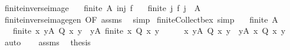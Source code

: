 \begin{isabellebody}
\endisatagproof
{\isafoldproof}%
%
\isadelimproof
\isanewline
%
\endisadelimproof
\isanewline
{}\isamarkupfalse%
\ finite{\isacharunderscore}{\kern0pt}inverse{\isacharunderscore}{\kern0pt}image{\isacharcolon}{\kern0pt}\isanewline
\ \ \ {\isachardoublequoteopen}finite\ A{\isachardoublequoteclose}\ {\isachardoublequoteopen}inj\ f{\isachardoublequoteclose}\isanewline
\ \ \ {\isachardoublequoteopen}finite\ {\isacharbraceleft}{\kern0pt}j{\isachardot}{\kern0pt}\ f\ j\ {\isasymin}\ A{\isacharbraceright}{\kern0pt}{\isachardoublequoteclose}\isanewline
%
\isadelimproof
\ \ %
\endisadelimproof
%
\isatagproof
{}\isamarkupfalse%
\ finite{\isacharunderscore}{\kern0pt}inverse{\isacharunderscore}{\kern0pt}image{\isacharunderscore}{\kern0pt}gen\ {\isacharbrackleft}{\kern0pt}OF\ assms{\isacharbrackright}{\kern0pt}\ \isamarkupfalse%
\ simp%
\endisatagproof
{\isafoldproof}%
%
\isadelimproof
\isanewline
%
\endisadelimproof
\isanewline
{}\isamarkupfalse%
\ finite{\isacharunderscore}{\kern0pt}Collect{\isacharunderscore}{\kern0pt}bex\ {\isacharbrackleft}{\kern0pt}simp{\isacharbrackright}{\kern0pt}{\isacharcolon}{\kern0pt}\isanewline
\ \ \ {\isachardoublequoteopen}finite\ A{\isachardoublequoteclose}\isanewline
\ \ \ {\isachardoublequoteopen}finite\ {\isacharbraceleft}{\kern0pt}x{\isachardot}{\kern0pt}\ {\isasymexists}y{\isasymin}A{\isachardot}{\kern0pt}\ Q\ x\ y{\isacharbraceright}{\kern0pt}\ {\isasymlongleftrightarrow}\ {\isacharparenleft}{\kern0pt}{\isasymforall}y{\isasymin}A{\isachardot}{\kern0pt}\ finite\ {\isacharbraceleft}{\kern0pt}x{\isachardot}{\kern0pt}\ Q\ x\ y{\isacharbraceright}{\kern0pt}{\isacharparenright}{\kern0pt}{\isachardoublequoteclose}\isanewline
%
\isadelimproof
%
\endisadelimproof
%
\isatagproof
{}\isamarkupfalse%
\ {\isacharminus}{\kern0pt}\isanewline
\ \ \isamarkupfalse%
\ {\isachardoublequoteopen}{\isacharbraceleft}{\kern0pt}x{\isachardot}{\kern0pt}\ {\isasymexists}y{\isasymin}A{\isachardot}{\kern0pt}\ Q\ x\ y{\isacharbraceright}{\kern0pt}\ {\isacharequal}{\kern0pt}\ {\isacharparenleft}{\kern0pt}{\isasymUnion}y{\isasymin}A{\isachardot}{\kern0pt}\ {\isacharbraceleft}{\kern0pt}x{\isachardot}{\kern0pt}\ Q\ x\ y{\isacharbraceright}{\kern0pt}{\isacharparenright}{\kern0pt}{\isachardoublequoteclose}\ \isamarkupfalse%
\ auto\isanewline
\ \ \isamarkupfalse%
\ assms\ \isamarkupfalse%
\ {\isacharquery}{\kern0pt}thesis\ \isamarkupfalse%

\end{isabellebody}
